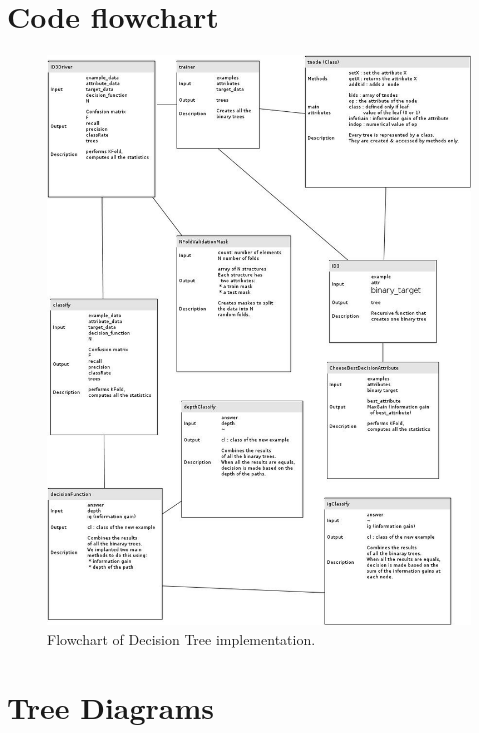 \documentclass[a4paper,12pt,oneside,final]{report}
\newenvironment{changemargin}[2]{\begin{list}{}{%
\setlength{\topsep}{0pt}%
\setlength{\leftmargin}{0pt}%
\setlength{\rightmargin}{0pt}%
\setlength{\listparindent}{\parindent}%
\setlength{\itemindent}{\parindent}%
\setlength{\parsep}{0pt plus 1pt}%
\addtolength{\leftmargin}{#1}%
\addtolength{\rightmargin}{#2}%
}\item }{\end{list}}
\begin{document}
\section{Code flowchart}
\begin{figure}[p]
\begin{changemargin}{-50mm}{-50mm}
\center
\includegraphics[height=0.97\textheight]{FlowChart.jpg}
\caption{Flowchart of Decision Tree implementation.}
\end{changemargin}
\end{figure}


\section{Tree Diagrams}
\end{document}
